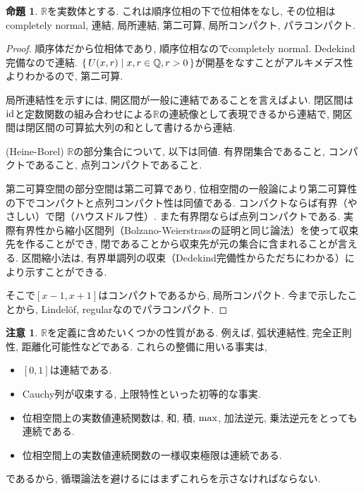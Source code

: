 \documentclass[a4paper, twoside]{bxjsarticle}
\newcommand{\quo}{\mathbb{Q}}
\newcommand{\rea}{\mathbb{R}}
\theoremstyle{definition}
\newtheorem{prop}[thm]{命題}
\newtheorem{rem}[thm]{注意}
\begin{document}
        \begin{prop}
            $\rea$を実数体とする. これは順序位相の下で位相体をなし, その位相はcompletely normal, 連結, 局所連結, 第二可算, 局所コンパクト, パラコンパクト. 
        \end{prop}
        \begin{proof}
            順序体だから位相体であり, 順序位相なのでcompletely normal. Dedekind完備なので連結. $\set{U(x, r)|x, r\in \quo, r>0}$が開基をなすことがアルキメデス性よりわかるので, 第二可算.
            
            局所連結性を示すには, 開区間が一般に連結であることを言えばよい. 閉区間は${\rm id}$と定数関数の組み合わせによる$\rea$の連続像として表現できるから連結で, 開区間は閉区間の可算拡大列の和として書けるから連結.
            
            (Heine-Borel) $\rea$の部分集合について, 以下は同値. 有界閉集合であること, コンパクトであること, 点列コンパクトであること.
            \begin{framed}
                第二可算空間の部分空間は第二可算であり, 位相空間の一般論により第二可算性の下でコンパクトと点列コンパクト性は同値である. コンパクトならば有界（やさしい）で閉（ハウスドルフ性）. また有界閉ならば点列コンパクトである. 実際有界性から縮小区間列（Bolzano-Weierstrassの証明と同じ論法）を使って収束先を作ることができ, 閉であることから収束先が元の集合に含まれることが言える. 区間縮小法は, 有界単調列の収束（Dedekind完備性からただちにわかる）により示すことができる.
            \end{framed}
            
            そこで$[x-1, x+1]$はコンパクトであるから, 局所コンパクト. 今まで示したことから, Lindelöf, regularなのでパラコンパクト.
        \end{proof}
        \begin{rem}
            $\rea$を定義に含めたいくつかの性質がある. 例えば, 弧状連結性, 完全正則性, 距離化可能性などである. これらの整備に用いる事実は,
            \begin{itemize}
                \item $[0,1]$は連結である.
                \item Cauchy列が収束する, 上限特性といった初等的な事実.
                \item 位相空間上の実数値連続関数は, 和, 積, ${\rm max}$, 加法逆元, 乗法逆元をとっても連続である.
                \item 位相空間上の実数値連続関数の一様収束極限は連続である.
            \end{itemize}
            であるから, 循環論法を避けるにはまずこれらを示さなければならない. 
        \end{rem}
\end{document}
